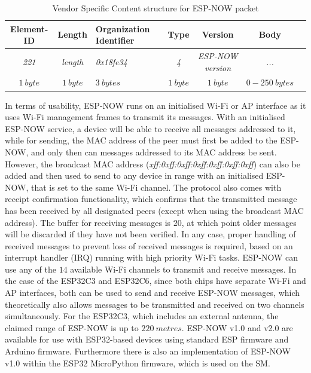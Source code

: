 \begin{table}[H]
    \centering
    \begin{tabular}{|c|c|>{\centering\arraybackslash}m{70pt}|c|c|c|c|}
        \hline
        \textbf{Element-ID} & \textbf{Length} & \textbf{Organization Identifier} & \textbf{Type} & \textbf{Version} & \textbf{Body} \\
        \hline\hline
        \textit{221} & \textit{length} & \textit{0x18fe34} & \textit{4} & \textit{ESP-NOW version} & \textit{...} \\
        \hline\hline
        $1\ byte$ & $1\ byte$ & $3\ bytes$ & $1\ byte$ & $1\ byte$ & $0-250\ bytes$ \\
        \hline
    \end{tabular}
    \vspace{\ftspace}
    \caption{Vendor Specific Content structure for ESP-NOW packet \citep[adapted from][]{espressif_systems_esp-now_nodate}}
    \label{tab:vendorpecificcontent}
\end{table}

In terms of usability, ESP-NOW runs on an initialised Wi-Fi or AP interface as it uses Wi-Fi management frames to transmit its messages. With an initialised ESP-NOW service, a device will be able to receive all messages addressed to it, while for sending, the MAC address of the peer must first be added to the ESP-NOW, and only then can messages addressed to its MAC address be sent. However, the broadcast MAC address (\textit{xff:0xff:0xff:0xff:0xff:0xff:0xff}) can also be added and then used to send to any device in range with an initialised ESP-NOW, that is set to the same Wi-Fi channel. The protocol also comes with receipt confirmation functionality, which confirms that the transmitted message has been received by all designated peers (except when using the broadcast MAC address). The buffer for receiving messages is $20$, at which point older messages will be discarded if they have not been verified. In any case, proper handling of received messages to prevent loss of received messages is required, based on an interrupt handler (IRQ) running with high priority Wi-Fi tasks. ESP-NOW can use any of the $14$ available Wi-Fi channels to transmit and receive messages. In the case of the ESP32C3 and ESP32C6, since both chips have separate Wi-Fi and AP interfaces, both can be used to send and receive ESP-NOW messages, which theoretically also allows messages to be transmitted and received on two channels simultaneously. For the ESP32C3, which includes an external antenna, the claimed range of ESP-NOW is up to $220\ metres$. ESP-NOW v1.0 and v2.0 are available for use with ESP32-based devices using standard ESP firmware and Arduino firmware. Furthermore there is also an implementation of ESP-NOW v1.0 within the ESP32 MicroPython firmware, which is used on the SM. \citep{espressif_systems_esp-now_nodate, micropython_micropython_2025-1}\\

